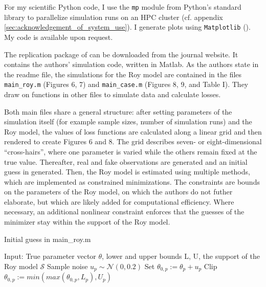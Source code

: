 For my scientific Python code, I use the \texttt{mp} module from Python's standard library to parallelize simulation runs on an HPC cluster (cf. appendix \ref{sec:acknowledgement_of_system_use}).
I generate plots using \texttt{Matplotlib} (\cite{Matplotlib}).
My code is available upon request. %

The replication package of \cite{kaji2023adversarial} can be downloaded from the journal website.
It contains the authors' simulation code, written in Matlab. %
As the authors state in the readme file, the simulations for the Roy model are contained in the files \texttt{main\_roy.m} (Figures 6, 7) and \texttt{main\_case.m} (Figures 8, 9, and Table I).
They draw on functions in other files to simulate data and calculate losses.

Both main files share a general structure:
after setting parameters of the simulation itself (for example sample sizes, number of simulation runs) and the Roy model, the values of loss functions are calculated along a linear grid and then rendered to create Figures 6 and 8.
The grid describes seven- or eight-dimensional ``cross-hairs'', where one parameter is varied while the others remain fixed at the true value.
Thereafter, real and fake observations are generated and an initial guess in generated.
Then, the Roy model is estimated using multiple methods, which are implemented as constrained minimizations.%
The constraints are bounds on the parameters of the Roy model, on which the authors do not futher elaborate, but which are likely added for computational efficiency. %
Where necessary, an additional nonlinear constraint enforces that the guesses of the minimizer stay within the support of the Roy model.

\begin{algorithm}
    \caption{Initial guess in main\_roy.m}
    \label{alg:theta0}
    \begin{algorithmic}[1]
        \STATE Input: True parameter vector $\theta$, lower and upper bounds L, U, the support of the Roy model $\mathcal{S}$
            \STATE Sample noise $u_p \sim \mathcal{N}(0, 0.2)$
            \STATE Set $\theta_{0,p} := \theta_p + u_p$
            \STATE Clip $\theta_{0,p} := min(max(\theta_{0,p}, L_p), U_p)$
        \ENDWHILE
    \end{algorithmic}
\end{algorithm}

